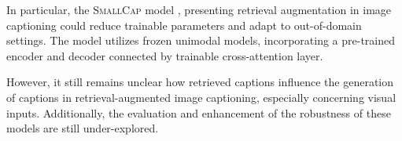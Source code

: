 In particular, the \textsc{SmallCap} model \citep{ramos2023smallcap}, presenting retrieval augmentation in image captioning could reduce trainable parameters and adapt to out-of-domain settings. The model utilizes frozen unimodal models, incorporating a pre-trained encoder and decoder connected by trainable cross-attention layer.

However, it still remains unclear how retrieved captions influence the generation of captions in retrieval-augmented image captioning, especially concerning visual inputs. Additionally, the evaluation and enhancement of the robustness of these models are still under-explored. 












